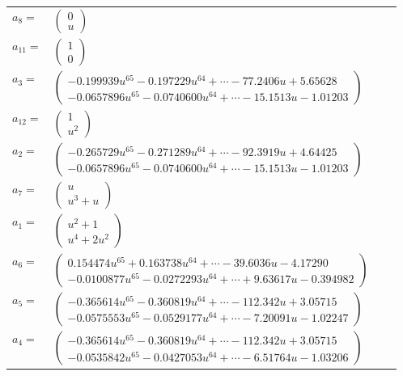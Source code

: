 \documentclass[1p]{elsarticle_modified}
\theoremstyle{definition}
\begin{document}
\begin{tabular}{m{7pt} m{180pt} m{7pt} m{180pt} }
\flushright $a_{8}=$&$\begin{pmatrix}0\\u\end{pmatrix}$ \\
\flushright $a_{11}=$&$\begin{pmatrix}1\\0\end{pmatrix}$ \\
\flushright $a_{3}=$&$\begin{pmatrix}-0.199939 u^{65}-0.197229 u^{64}+\cdots-77.2406 u+5.65628\\-0.0657896 u^{65}-0.0740600 u^{64}+\cdots-15.1513 u-1.01203\end{pmatrix}$ \\
\flushright $a_{12}=$&$\begin{pmatrix}1\\u^2\end{pmatrix}$ \\
\flushright $a_{2}=$&$\begin{pmatrix}-0.265729 u^{65}-0.271289 u^{64}+\cdots-92.3919 u+4.64425\\-0.0657896 u^{65}-0.0740600 u^{64}+\cdots-15.1513 u-1.01203\end{pmatrix}$ \\
\flushright $a_{7}=$&$\begin{pmatrix}u\\u^3+u\end{pmatrix}$ \\
\flushright $a_{1}=$&$\begin{pmatrix}u^2+1\\u^4+2 u^2\end{pmatrix}$ \\
\flushright $a_{6}=$&$\begin{pmatrix}0.154474 u^{65}+0.163738 u^{64}+\cdots-39.6036 u-4.17290\\-0.0100877 u^{65}-0.0272293 u^{64}+\cdots+9.63617 u-0.394982\end{pmatrix}$ \\
\flushright $a_{5}=$&$\begin{pmatrix}-0.365614 u^{65}-0.360819 u^{64}+\cdots-112.342 u+3.05715\\-0.0575553 u^{65}-0.0529177 u^{64}+\cdots-7.20091 u-1.02247\end{pmatrix}$ \\
\flushright $a_{4}=$&$\begin{pmatrix}-0.365614 u^{65}-0.360819 u^{64}+\cdots-112.342 u+3.05715\\-0.0535842 u^{65}-0.0427053 u^{64}+\cdots-6.51764 u-1.03206\end{pmatrix}$ \\

\end{tabular}
\end{document}
